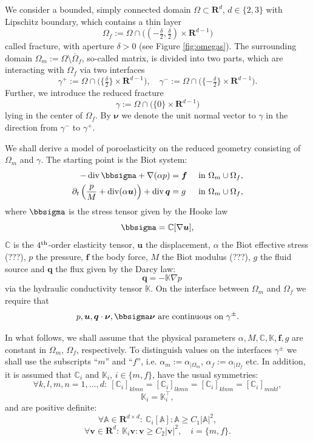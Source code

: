 \documentclass[a4paper]{article}
\def\div{\operatorname{div}}
\def\ff{\vc f}
\def\nnu{\vc\nu}
\def\prtl{\partial}
\def\qq{\vc q}
\def\Real{{\mathbf R}}
\def\tn#1{{\mathbb{#1}}}    %
\def\uu{\vc u}
\def\vc#1{\mathbf{\boldsymbol{#1}}}     %
\def\vv{\vc v}
\newcommand{\eq}[1]{\begin{equation}#1\end{equation}}
\begin{document}
We consider a bounded, simply connected domain $\Omega \subset \Real^d$, $d\in\{2,3\}$ with Lipschitz boundary, which contains a thin layer
\eq{ \Omega_f := \Omega\cap \big((-\tfrac\delta2,\tfrac\delta2)\times\Real^{d-1}\big) }
called fracture, with aperture $\delta>0$ (see Figure \ref{fig:omegas}).
The surrounding domain $\Omega_m:=\Omega\setminus\overline\Omega_f$, so-called matrix, is divided into two parts, which are interacting with $\Omega_f$ via two interfaces
\eq{ \gamma^+:=\Omega\cap\big( \{\tfrac\delta2\}\times \Real^{d-1}\big), \quad \gamma^-:=\Omega\cap\big( \{ -\tfrac\delta2\}\times \Real^{d-1}\big). }
Further, we introduce the reduced fracture
\eq{ \gamma:=\Omega\cap\big(\{0\}\times\Real^{d-1}\big) }
lying in the center of $\Omega_f$.
By $\nnu$ we denote the unit normal vector to $\gamma$ in the direction from $\gamma^-$ to $\gamma^+$.

We shall derive a model of poroelasticity on the reduced geometry consisting of $\Omega_m$ and $\gamma$.
The starting point is the Biot system:
\begin{subequations}
\label{eq:biot}
\begin{align}
    \label{eq:lin_el}
    -\div \bbsigma + \nabla(\alpha p) &= \ff &&\mbox{ in }\Omega_m\cup\Omega_f,\\
\label{eq:biot_darcy}    \prtl_t\left(\frac{p}{M} + \div(\alpha\uu)\right) + \div\qq &= g &&\mbox{ in }\Omega_m\cup\Omega_f,
\end{align}
\end{subequations}
where $\bbsigma$ is the stress tensor given by the Hooke law
\eq{ \bbsigma = \tn C[\nabla\uu], }
$\tn C$ is the $4^{\rm th}$-order elasticity tensor, $\uu$ the displacement, $\alpha$ the Biot effective stress (???), $p$ the pressure, $\ff$ the body force, $M$ the Biot modulus (???), $g$ the fluid source and $\qq$ the flux given by the Darcy law:
\[ \quad \qq = -\tn K\nabla p \]
via the hydraulic conductivity tensor $\tn K$.
On the interface between $\Omega_m$ and $\Omega_f$ we require that
\eq{ p,\uu,\qq\cdot\nnu,\bbsigma\nnu \mbox{ are continuous on } \gamma^\pm. }

In what follows, we shall assume that the physical parameters $\alpha,M,\tn C,\tn K,\ff,g$ are constant in $\Omega_m$, $\Omega_f$, respectively.
To distinguish values on the interfaces $\gamma^\pm$ we shall use the subscripts ``$m$'' and ``$f$'', i.e. $\alpha_m := \alpha_{|\Omega_m}$, $\alpha_f := \alpha_{|\Omega_f}$ etc.
In addition, it is assumed that $\tn C_i$ and $\tn K_i$, $i\in\{m,f\}$, have the usual symmetries:
\eq{ \forall k,l,m,n=1,\ldots,d:~ [\tn C_i]_{klmn}=[\tn C_i]_{lkmn}=[\tn C_i]_{klnm}=[\tn C_i]_{mnkl}, }
\eq{ \tn K_i = \tn K_i^\top, }
and are positive definite:
\eq{ \forall\tn A\in\Real^{d\times d}:~\tn C_i[\tn A]:\tn A \ge C_1|\tn A|^2, }
\eq{ \forall\vv\in\Real^d:~\tn K_i\vv:\vv \ge C_2|\vv|^2,\quad i=\{m,f\}. }
\end{document}
